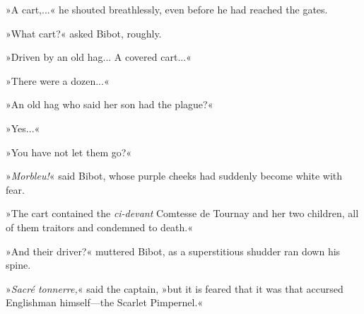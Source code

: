 »A cart,...« he shouted breathlessly, even before he had reached the gates.

»What cart?« asked Bibot, roughly.

»Driven by an old hag... A covered cart...«

»There were a dozen...«

»An old hag who said her son had the plague?«

»Yes...«

»You have not let them go?«

»\textit{Morbleu!}« said Bibot, whose purple cheeks had suddenly become white with fear.

»The cart contained the \textit{ci-devant} Comtesse de Tournay and her two children, all of them traitors and condemned to death.«

»And their driver?« muttered Bibot, as a superstitious shudder ran down his spine.

»\textit{Sacré tonnerre,}« said the captain, »but it is feared that it was that accursed Englishman himself\allowbreak---\allowbreak the Scarlet Pimpernel.«
